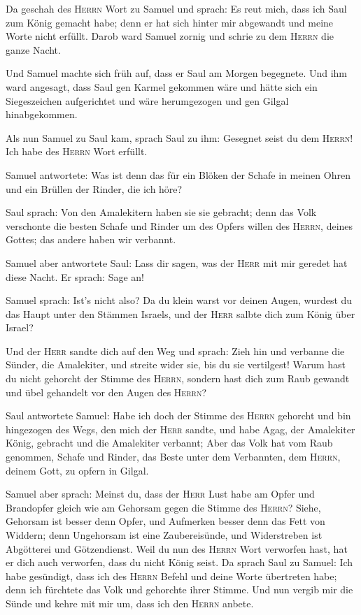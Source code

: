  Da geschah des \textsc{Herrn} Wort zu Samuel und sprach:
 Es reut mich, dass ich Saul zum König gemacht habe; denn
er hat sich hinter mir abgewandt und meine Worte nicht erfüllt. Darob
ward Samuel zornig und schrie zu dem \textsc{Herrn} die ganze Nacht.

 Und Samuel machte sich früh auf, dass er Saul am Morgen
begegnete. Und ihm ward angesagt, dass Saul gen Karmel gekommen wäre und
hätte sich ein Siegeszeichen aufgerichtet und wäre herumgezogen und gen
Gilgal hinabgekommen.

 Als nun Samuel zu Saul kam, sprach Saul zu ihm: Gesegnet
seist du dem \textsc{Herrn}! Ich habe des \textsc{Herrn} Wort erfüllt.

 Samuel antwortete: Was ist denn das für ein Blöken der
Schafe in meinen Ohren und ein Brüllen der Rinder, die ich höre?

 Saul sprach: Von den Amalekitern haben sie sie gebracht;
denn das Volk verschonte die besten Schafe und Rinder um des Opfers
willen des \textsc{Herrn}, deines Gottes; das andere haben wir verbannt.

 Samuel aber antwortete Saul: Lass dir sagen, was der
\textsc{Herr} mit mir geredet hat diese Nacht. Er sprach: Sage an!

 Samuel sprach: Ist's nicht also? Da du klein warst vor
deinen Augen, wurdest du das Haupt unter den Stämmen Israels, und der
\textsc{Herr} salbte dich zum König über Israel?

 Und der \textsc{Herr} sandte dich auf den Weg und
sprach: Zieh hin und verbanne die Sünder, die Amalekiter, und streite
wider sie, bis du sie vertilgest!  Warum hast du nicht
gehorcht der Stimme des \textsc{Herrn}, sondern hast dich zum Raub
gewandt und übel gehandelt vor den Augen des \textsc{Herrn}?

 Saul antwortete Samuel: Habe ich doch der Stimme des
\textsc{Herrn} gehorcht und bin hingezogen des Wegs, den mich der
\textsc{Herr} sandte, und habe Agag, der Amalekiter König, gebracht und
die Amalekiter verbannt;  Aber das Volk hat vom Raub
genommen, Schafe und Rinder, das Beste unter dem Verbannten, dem
\textsc{Herrn}, deinem Gott, zu opfern in Gilgal.

 Samuel aber sprach: Meinst du, dass der \textsc{Herr}
Lust habe am Opfer und Brandopfer gleich wie am Gehorsam gegen die
Stimme des \textsc{Herrn}? Siehe, Gehorsam ist besser denn Opfer, und
Aufmerken besser denn das Fett von Widdern;  denn
Ungehorsam ist eine Zaubereisünde, und Widerstreben ist Abgötterei und
Götzendienst. Weil du nun des \textsc{Herrn} Wort verworfen hast, hat er
dich auch verworfen, dass du nicht König seist.  Da
sprach Saul zu Samuel: Ich habe gesündigt, dass ich des \textsc{Herrn}
Befehl und deine Worte übertreten habe; denn ich fürchtete das Volk und
gehorchte ihrer Stimme.  Und nun vergib mir die Sünde und
kehre mit mir um, dass ich den \textsc{Herrn} anbete.

